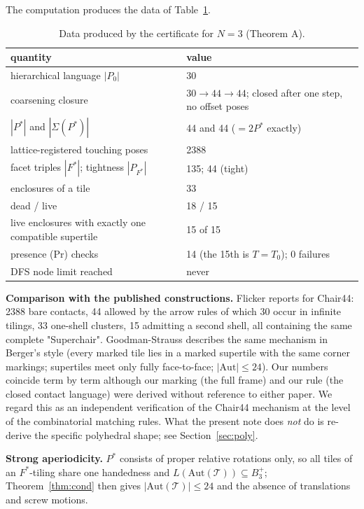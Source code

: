 \documentclass[11pt,a4paper]{article}
\theoremstyle{plain}
\theoremstyle{definition}
\begin{document}
The computation produces the data of Table~\ref{tab:N3}.

\begin{table}[t]\centering\small
\begin{tabular}{p{4.5cm}p{8cm}}\toprule
\textbf{quantity} & \textbf{value} \\ \midrule
hierarchical language $|P_0|$ & 30 \\
coarsening closure & $30 \to 44 \to 44$; closed after one step, no offset poses \\
$|P^*|$ and $|\Sigma(P^*)|$ & 44 and 44 ($= 2P^*$ exactly) \\
lattice-registered touching poses & 2388 \\
facet triples $|F^*|$; tightness $|P_{F^*}|$ & 135; 44 (tight) \\
enclosures of a tile & 33 \\
dead / live & 18 / 15 \\
live enclosures with exactly one compatible supertile & 15 of 15 \\
presence (Pr) checks & 14 (the 15th is $T = T_0$); 0 failures \\
DFS node limit reached & never \\
\bottomrule\end{tabular}
\caption{Data produced by the certificate for $N = 3$ (Theorem A).}\label{tab:N3}\end{table}

\textbf{Comparison with the published constructions.} Flicker \cite{flicker} reports for Chair44: 2388 bare contacts, 44 allowed by the arrow rules of which 30 occur in infinite tilings, 33 one-shell clusters, 15 admitting a second shell, all containing the same complete "Superchair". Goodman-Strauss \cite{gs2026} describes the same mechanism in Berger's style (every marked tile lies in a marked supertile with the same corner markings; supertiles meet only fully face-to-face; $|\mathrm{Aut}| \le  24$). Our numbers coincide term by term although our marking (the full frame) and our rule (the closed contact language) were derived without reference to either paper. We regard this as an independent verification of the Chair44 mechanism at the level of the combinatorial matching rules. What the present note does \emph{not} do is re-derive the specific polyhedral shape; see Section~\ref{sec:poly}.

\textbf{Strong aperiodicity.} $P^*$ consists of proper relative rotations only, so all tiles of an $F^*$-tiling share one handedness and $L(\mathrm{Aut}(\mathcal{T})) \subseteq B_3^+$; Theorem~\ref{thm:cond} then gives $|\mathrm{Aut}(\mathcal{T})| \le  24$ and the absence of translations and screw motions.
\end{document}
